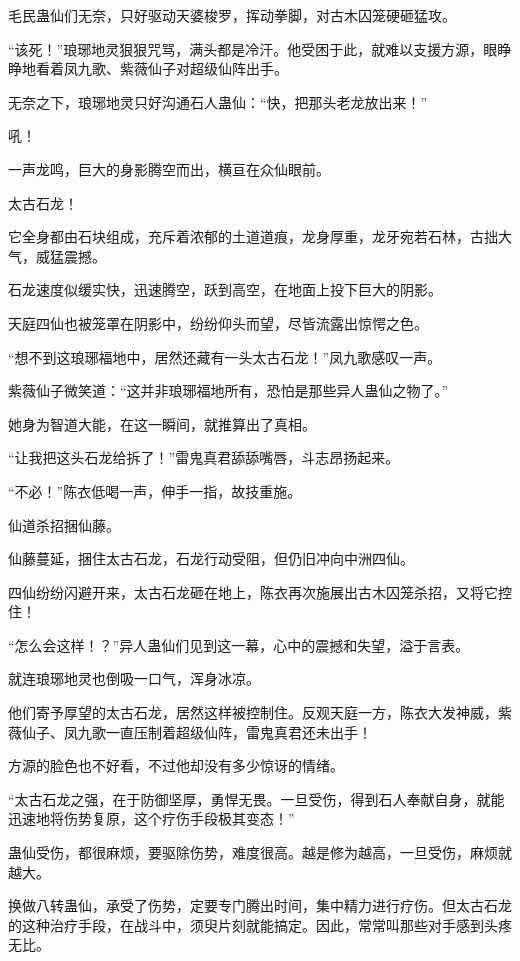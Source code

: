 \begin{this_body}
毛民蛊仙们无奈，只好驱动天婆梭罗，挥动拳脚，对古木囚笼硬砸猛攻。

“该死！”琅琊地灵狠狠咒骂，满头都是冷汗。他受困于此，就难以支援方源，眼睁睁地看着凤九歌、紫薇仙子对超级仙阵出手。

无奈之下，琅琊地灵只好沟通石人蛊仙：“快，把那头老龙放出来！”

吼！

一声龙鸣，巨大的身影腾空而出，横亘在众仙眼前。

太古石龙！

它全身都由石块组成，充斥着浓郁的土道道痕，龙身厚重，龙牙宛若石林，古拙大气，威猛震撼。

石龙速度似缓实快，迅速腾空，跃到高空，在地面上投下巨大的阴影。

天庭四仙也被笼罩在阴影中，纷纷仰头而望，尽皆流露出惊愕之色。

“想不到这琅琊福地中，居然还藏有一头太古石龙！”凤九歌感叹一声。

紫薇仙子微笑道：“这并非琅琊福地所有，恐怕是那些异人蛊仙之物了。”

她身为智道大能，在这一瞬间，就推算出了真相。

“让我把这头石龙给拆了！”雷鬼真君舔舔嘴唇，斗志昂扬起来。

“不必！”陈衣低喝一声，伸手一指，故技重施。

仙道杀招捆仙藤。

仙藤蔓延，捆住太古石龙，石龙行动受阻，但仍旧冲向中洲四仙。

四仙纷纷闪避开来，太古石龙砸在地上，陈衣再次施展出古木囚笼杀招，又将它控住！

“怎么会这样！？”异人蛊仙们见到这一幕，心中的震撼和失望，溢于言表。

就连琅琊地灵也倒吸一口气，浑身冰凉。

他们寄予厚望的太古石龙，居然这样被控制住。反观天庭一方，陈衣大发神威，紫薇仙子、凤九歌一直压制着超级仙阵，雷鬼真君还未出手！

方源的脸色也不好看，不过他却没有多少惊讶的情绪。

“太古石龙之强，在于防御坚厚，勇悍无畏。一旦受伤，得到石人奉献自身，就能迅速地将伤势复原，这个疗伤手段极其变态！”

蛊仙受伤，都很麻烦，要驱除伤势，难度很高。越是修为越高，一旦受伤，麻烦就越大。

换做八转蛊仙，承受了伤势，定要专门腾出时间，集中精力进行疗伤。但太古石龙的这种治疗手段，在战斗中，须臾片刻就能搞定。因此，常常叫那些对手感到头疼无比。


\end{this_body}
